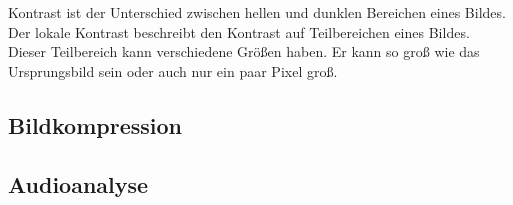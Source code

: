 \documentclass[12pt, a4paper, ngerman]{article}
\begin{document}
Kontrast ist der Unterschied zwischen hellen 
und dunklen Bereichen eines Bildes.
Der lokale Kontrast beschreibt 
den Kontrast auf Teilbereichen eines Bildes.
Dieser Teilbereich kann verschiedene Größen haben.
Er kann so groß wie das Ursprungsbild sein
oder auch nur ein paar Pixel groß.




\subsection{Bildkompression}
\subsection{Audioanalyse}

\newpage
\printbibliography
\end{document}
